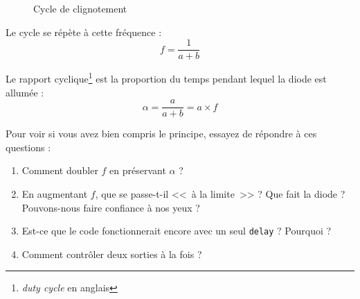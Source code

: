 \documentclass[11pt,a4paper,oneside,twocolumn]{article}
\begin{document}
\begin{figure}[ht]
	\centering
	\caption{Cycle de clignotement}
	\label{fig:slice}
\end{figure}

Le cycle se répète à cette fréquence :
\begin{equation}
	f=\frac1{a+b}
\end{equation}

Le rapport cyclique\footnote{\emph{duty cycle} en anglais} est la proportion du
temps pendant lequel la diode est allumée :
\begin{equation}
	\alpha=\frac a{a+b}=a\times f
\end{equation}

Pour voir si vous avez bien compris le principe, essayez de répondre à ces
questions :
\begin{enumerate}
\item Comment doubler $f$ en préservant $\alpha$ ?
\item En augmentant $f$, que se passe-t-il <<~à la limite~>> ? Que fait la
	diode ? Pouvons-nous faire confiance à nos yeux ?
\item Est-ce que le code fonctionnerait encore avec un seul \texttt{delay} ?
	Pourquoi ?
\item Comment contrôler deux sorties à la fois ?
\end{enumerate}
\end{document}
